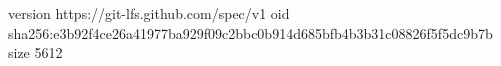 version https://git-lfs.github.com/spec/v1
oid sha256:e3b92f4ce26a41977ba929f09c2bbc0b914d685bfb4b3b31c08826f5f5dc9b7b
size 5612
